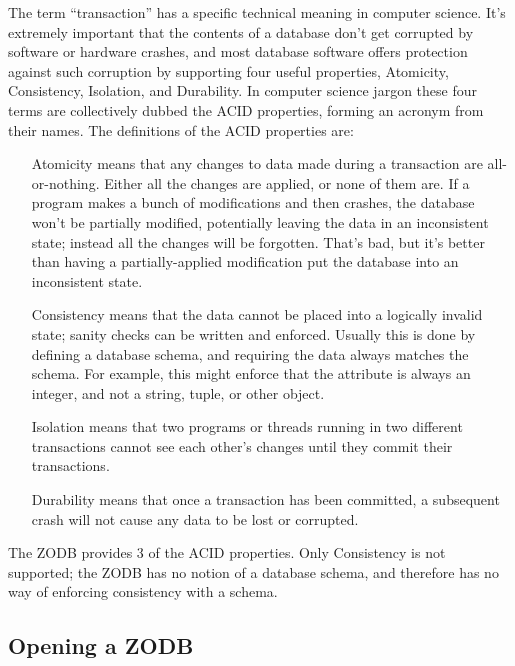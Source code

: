 The term ``transaction'' has a specific technical meaning in computer
science.  It's extremely important that the contents of a database
don't get corrupted by software or hardware crashes, and most database
software offers protection against such corruption by supporting four
useful properties, Atomicity, Consistency, Isolation, and Durability.
In computer science jargon these four terms are collectively dubbed
the ACID properties, forming an acronym from their names.  The
definitions of the ACID properties are:

\begin{itemize}

\item[Atomicity] means that any changes to data made during a transaction 
are all-or-nothing.  Either all the changes are applied, or none of
them are.  If a program makes a bunch of modifications and then
crashes, the database won't be partially modified, potentially leaving
the data in an inconsistent state; instead all the changes will be
forgotten.  That's bad, but it's better than having a
partially-applied modification put the database into an inconsistent
state.

\item[Consistency] means that the data cannot be placed into a
logically invalid state; sanity checks can be written and enforced.
Usually this is done by defining a database schema, and requiring the
data always matches the schema.  For example, this might enforce that
the  attribute is always an integer, and not a
string, tuple, or other object.

\item[Isolation] means that two programs or threads running in two
 different transactions cannot see each other's changes until they
 commit their transactions.

\item[Durability] means that once a transaction has been committed,
a subsequent crash will not cause any data to be lost or corrupted.

\end{itemize}

The ZODB provides 3 of the ACID properties.  Only Consistency is not
supported; the ZODB has no notion of a database schema, and therefore
has no way of enforcing consistency with a schema.

\subsection{Opening a ZODB}

